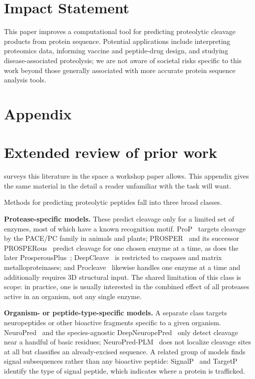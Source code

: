 \documentclass{article}
\begin{document}



\section*{Impact Statement}
This paper improves a computational tool for predicting proteolytic cleavage products from protein sequence. Potential applications include interpreting proteomics data, informing vaccine and peptide-drug design, and studying disease-associated proteolysis; we are not aware of societal risks specific to this work beyond those generally associated with more accurate protein sequence analysis tools.
\newpage
\appendix
\section*{Appendix}

\section{Extended review of prior work}
\label{sec:app-related}

 surveys this literature in the space a workshop paper allows. This appendix
gives the same material in the detail a reader unfamiliar with the task will want.


Methods for predicting proteolytic peptides fall into three broad classes.

\textbf{Protease-specific models.} These predict cleavage only for a limited set of enzymes, most of which have a known recognition motif. ProP~\citep{duckert2004prop} targets cleavage by the PACE/PC family in animals and plants; PROSPER~\citep{song2012prosper} and its successor PROSPERous~\citep{song2018prosperous} predict cleavage for one chosen enzyme at a time, as does the later ProsperousPlus~\citep{li2023prosperousplus}; DeepCleave~\citep{li2020deepcleave} is restricted to caspases and matrix metalloproteinases; and Procleave~\citep{li2020procleave} likewise handles one enzyme at a time and additionally requires 3D structural input. The shared limitation of this class is scope: in practice, one is usually interested in the combined effect of all proteases active in an organism, not any single enzyme.

\textbf{Organism- or peptide-type-specific models.} A separate class targets neuropeptides or other bioactive fragments specific to a given organism. NeuroPred~\citep{southey2006neuropred} and the species-agnostic DeepNeuropePred~\citep{wang2024deepneuropepred} only detect cleavage near a handful of basic residues; NeuroPred-PLM~\citep{wang2023neuropredplm} does not localize cleavage sites at all but classifies an already-excised sequence. A related group of models finds signal subsequences rather than any bioactive peptide: SignalP~\citep{teufel2022signalp6} and TargetP~\citep{almagro2019targetp} identify the type of signal peptide, which indicates where a protein is trafficked.
\end{document}
